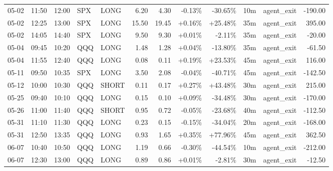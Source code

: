 \documentclass[11pt,a4paper,twoside]{article}
\begin{document}
\begin{center}
\begin{longtable}{>{\color{txtmain}}l l l l l r r r r r >{\color{txtmain}}l r}
05-02 & 11:50 & 12:00 & SPX & LONG & 6.20 & 4.30 & \textcolor{lossred}{-0.13\%} & \textcolor{lossred}{-30.65\%} & 10m & agent\_exit & \textcolor{lossred}{-190.00} \\
05-02 & 12:25 & 13:00 & SPX & LONG & 15.50 & 19.45 & \textcolor{wingreen}{+0.16\%} & \textcolor{wingreen}{+25.48\%} & 35m & agent\_exit & \textcolor{wingreen}{395.00} \\
05-02 & 14:05 & 14:40 & SPX & LONG & 9.50 & 9.30 & \textcolor{wingreen}{+0.01\%} & \textcolor{lossred}{-2.11\%} & 35m & agent\_exit & \textcolor{lossred}{-20.00} \\
05-04 & 09:45 & 10:20 & QQQ & LONG & 1.48 & 1.28 & \textcolor{wingreen}{+0.04\%} & \textcolor{lossred}{-13.80\%} & 35m & agent\_exit & \textcolor{lossred}{-61.50} \\
05-04 & 11:55 & 12:40 & QQQ & LONG & 0.08 & 0.11 & \textcolor{wingreen}{+0.19\%} & \textcolor{wingreen}{+23.53\%} & 45m & agent\_exit & \textcolor{wingreen}{116.00} \\
05-11 & 09:50 & 10:35 & SPX & LONG & 3.50 & 2.08 & \textcolor{lossred}{-0.04\%} & \textcolor{lossred}{-40.71\%} & 45m & agent\_exit & \textcolor{lossred}{-142.50} \\
05-12 & 10:00 & 10:30 & QQQ & SHORT & 0.11 & 0.17 & \textcolor{wingreen}{+0.27\%} & \textcolor{wingreen}{+43.48\%} & 30m & agent\_exit & \textcolor{wingreen}{215.00} \\
05-25 & 09:40 & 10:10 & QQQ & LONG & 0.15 & 0.10 & \textcolor{wingreen}{+0.09\%} & \textcolor{lossred}{-34.48\%} & 30m & agent\_exit & \textcolor{lossred}{-170.00} \\
05-26 & 11:00 & 11:40 & QQQ & SHORT & 0.95 & 0.72 & \textcolor{lossred}{-0.05\%} & \textcolor{lossred}{-23.68\%} & 40m & agent\_exit & \textcolor{lossred}{-112.50} \\
05-31 & 11:10 & 11:30 & QQQ & LONG & 0.23 & 0.15 & \textcolor{lossred}{-0.15\%} & \textcolor{lossred}{-34.04\%} & 20m & agent\_exit & \textcolor{lossred}{-168.00} \\
05-31 & 12:50 & 13:35 & QQQ & LONG & 0.93 & 1.65 & \textcolor{wingreen}{+0.35\%} & \textcolor{wingreen}{+77.96\%} & 45m & agent\_exit & \textcolor{wingreen}{362.50} \\
06-07 & 10:40 & 10:50 & QQQ & LONG & 1.19 & 0.66 & \textcolor{lossred}{-0.30\%} & \textcolor{lossred}{-44.54\%} & 10m & agent\_exit & \textcolor{lossred}{-212.00} \\
06-07 & 12:30 & 13:00 & QQQ & LONG & 0.89 & 0.86 & \textcolor{wingreen}{+0.01\%} & \textcolor{lossred}{-2.81\%} & 30m & agent\_exit & \textcolor{lossred}{-12.50} \\

\end{longtable}
\end{center}
\end{document}
